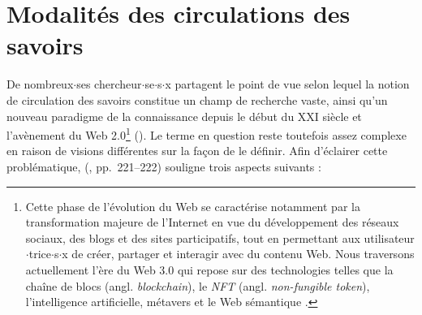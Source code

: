 \label{sota}
\section{Modalités des circulations des savoirs}
De nombreux$\cdot$ses chercheur$\cdot$se$\cdot$s$\cdot$x partagent le point de vue selon lequel la notion de \og{}circulation des savoirs\fg{} constitue un champ de recherche vaste, ainsi qu'un nouveau paradigme de la connaissance depuis le début du XXI\ieme{} siècle et l'avènement du Web 2.0\footnote{Cette phase de l'évolution du Web se caractérise notamment par la transformation majeure de l'Internet en vue du développement des réseaux sociaux, des blogs et des sites participatifs, tout en permettant aux utilisateur$\cdot$trice$\cdot$s$\cdot$x de créer, partager et interagir avec du contenu Web. Nous traversons actuellement l'ère du Web 3.0 qui repose sur des technologies telles que la chaîne de blocs (angl. \textit{blockchain}), le \textit{NFT} (angl. \textit{non-fungible token}), l'intelligence artificielle, métavers et le Web sémantique \citep{varet2023nouvelles}.}  (\citealp{landais2014frederic,quet2014frederic}). Le terme en question reste toutefois assez complexe en raison de visions différentes sur la façon de le définir. Afin d'éclairer cette problématique, \citeauthor{quet2014frederic} (\citeyear{quet2014frederic}, pp.~221--222) souligne trois aspects suivants :
